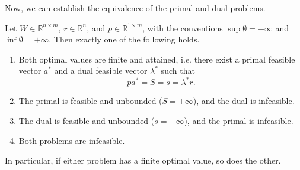 	Now, we can establish the equivalence of the primal and dual problems. 

	\begin{theorem}
	  \label{thm:strong-duality}
		Let $W \in \mathbb{R}^{n \times m}$, $r \in \mathbb{R}^n$, and $p \in \mathbb{R}^{1 \times m}$, with the conventions $\sup \emptyset = -\infty$ and $\inf \emptyset = +\infty$. Then exactly one of the following holds. 
		\begin{enumerate}
			\item Both optimal values are finite and attained, i.e. there exist a primal feasible vector $a^\ast$ and a dual feasible vector $\lambda^\ast$ such that
				\begin{equation}
					pa^\ast = S = s = \lambda^\ast r.
				\end{equation}
			\item The primal is feasible and unbounded ($S = +\infty$), and the dual is infeasible. 
			\item The dual is feasible and unbounded ($s = -\infty$), and the primal is infeasible. 
			\item Both problems are infeasible. 
		\end{enumerate}
		In particular, if either problem has a finite optimal value, so does the other. 
	\end{theorem}
